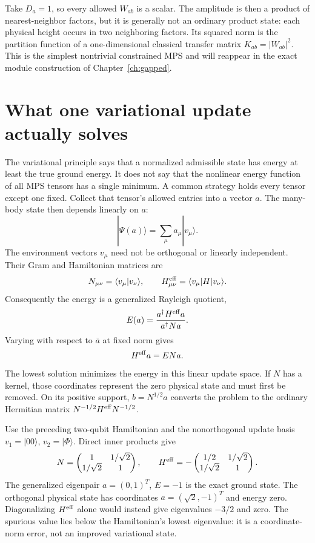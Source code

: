 \begin{example}
Take $D_a=1$, so every allowed $W_{ab}$ is a scalar. The amplitude is
then a product of nearest-neighbor factors, but it is generally not an
ordinary product state: each physical height occurs in two neighboring
factors. Its squared norm is the partition function of a one-dimensional
classical transfer matrix $K_{ab}=|W_{ab}|^2$. This is the simplest
nontrivial constrained MPS and will reappear in the exact module
construction of Chapter~\ref{ch:gapped}.
\end{example}

\section{What one variational update actually solves}

The variational principle says that a normalized admissible state has
energy at least the true ground energy. It does not say that the
nonlinear energy function of all MPS tensors has a single minimum.
A common strategy holds every tensor except one fixed. Collect that
tensor's allowed entries into a vector $a$. The many-body state then
depends linearly on $a$:
\[
 |\Psi(a)\rangle=\sum_\mu a_\mu|v_\mu\rangle.
\]
The environment vectors $v_\mu$ need not be orthogonal or linearly
independent. Their Gram and Hamiltonian matrices are
\[
 N_{\mu\nu}=\langle v_\mu|v_\nu\rangle,\qquad
 H^{\rm eff}_{\mu\nu}=\langle v_\mu|H|v_\nu\rangle.
\]
Consequently the energy is a generalized Rayleigh quotient,
\[
 E(a)=\frac{a^\dagger H^{\rm eff}a}{a^\dagger Na}.
\]
Varying with respect to $\overline a$ at fixed norm gives
\begin{equation}
 H^{\rm eff}a=E Na.
 \label{eq:MPS-local-update}
\end{equation}
The lowest solution minimizes the energy in this linear update
space. If $N$ has a kernel, those coordinates represent the zero
physical state and must first be removed. On its positive support,
$b=N^{1/2}a$ converts the problem to the ordinary Hermitian matrix
$N^{-1/2}H^{\rm eff}N^{-1/2}$.

\begin{example}
Use the preceding two-qubit Hamiltonian and the nonorthogonal update
basis $v_1=|00\rangle$, $v_2=|\Phi\rangle$. Direct inner products give
\[
 N=\begin{pmatrix}1&1/\sqrt2\\1/\sqrt2&1\end{pmatrix},
 \qquad H^{\rm eff}=-\begin{pmatrix}1/2&1/\sqrt2\\1/\sqrt2&1\end{pmatrix}.
\]
The generalized eigenpair $a=(0,1)^T$, $E=-1$ is the exact
ground state. The orthogonal physical state has coordinates
$a=(\sqrt2,-1)^T$ and energy zero. Diagonalizing $H^{\rm eff}$
alone would instead give eigenvalues $-3/2$ and zero. The spurious
value lies below the Hamiltonian's lowest eigenvalue: it is a
coordinate-norm error, not an improved variational state.
\end{example}

